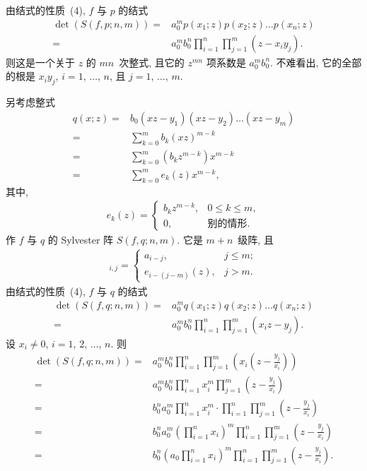 \documentclass[../libro.tex]{subfiles}
\begin{document}
由结式的性质~(4), \(f\) 与 \(p\) 的结式
\begin{align*}
    \det {(S(f, p; n, m))}
    = {} &
    a_0^m p(x_1; z) p(x_2; z) \dots p(x_n; z)
    \\
    = {} &
    a_0^m b_0^n
    \prod_{i = 1}^{n} \prod_{j = 1}^{m}
    {(z - x_i y_j)}.
\end{align*}
则这是一个关于 \(z\) 的 \(m n\)~次整式,
且它的 \(z^{m n}\) 项系数是 \(a_0^m b_0^n\).
不难看出, 它的全部的根是 \(x_i y_j\),
\(i = 1\), \(\dots\), \(n\),
且 \(j = 1\), \(\dots\), \(m\).

另考虑整式
\begin{align*}
    q(x; z)
    = {} &
    b_0 (x z - y_1) (x z - y_2) \dots (x z - y_m)
    \\
    = {} &
    \sum_{k = 0}^{m} b_k (x z)^{m-k}
    \\
    = {} &
    \sum_{k = 0}^{m} (b_k z^{m-k}) x^{m-k}
    \\
    = {} &
    \sum_{k = 0}^{m} {e_k (z) x^{m-k}},
\end{align*}
其中,
\begin{align*}
    e_k (z) =
    \begin{cases}
        b_k z^{m-k}, & 0 \leq k \leq m, \\
        0,           & \text{别的情形}.
    \end{cases}
\end{align*}
作 \(f\) 与 \(q\) 的 Sylvester 阵 \(S(f, q; n, m)\).
它是 \(m + n\)~级阵, 且
\begin{align*}
    [S(f, q; n, m)]_{i,j} =
    \begin{cases}
        a_{i-j},         & j \leq m; \\
        e_{i-(j-m)} (z), & j > m.
    \end{cases}
\end{align*}
由结式的性质~(4), \(f\) 与 \(q\) 的结式
\begin{align*}
    \det {(S(f, q; n, m))}
    = {} &
    a_0^m q(x_1; z) q(x_2; z) \dots q(x_n; z)
    \\
    = {} &
    a_0^m b_0^n
    \prod_{i = 1}^{n}
    \prod_{j = 1}^{m} {(x_i z - y_j)}.
\end{align*}
设 \(x_i \neq 0\), \(i = 1\), \(2\), \(\dots\), \(n\).
则
\begin{align*}
    \det {(S(f, q; n, m))}
    = {} &
    a_0^m b_0^n
    \prod_{i = 1}^{n}
    \prod_{j = 1}^{m} {\left( x_i \left( z - \frac{y_j}{x_i} \right) \right)}
    \\
    = {} &
    a_0^m b_0^n
    \prod_{i = 1}^{n} x_i^m
    \prod_{j = 1}^{m} {\left( z - \frac{y_j}{x_i} \right)}
    \\
    = {} &
    b_0^n a_0^m
    \prod_{i = 1}^{n} x_i^m
    \cdot
    \prod_{i = 1}^{n} \prod_{j = 1}^{m}
    {\left( z - \frac{y_j}{x_i} \right)}
    \\
    = {} &
    b_0^n a_0^m
    \left(\prod_{i = 1}^{n} x_i\right)^m
    \prod_{i = 1}^{n} \prod_{j = 1}^{m}
    {\left( z - \frac{y_j}{x_i} \right)}
    \\
    = {} &
    b_0^n
    \left( a_0 \prod_{i = 1}^{n} x_i \right)^m
    \prod_{i = 1}^{n} \prod_{j = 1}^{m}
    {\left( z - \frac{y_j}{x_i} \right)}.
\end{align*}
\end{document}
